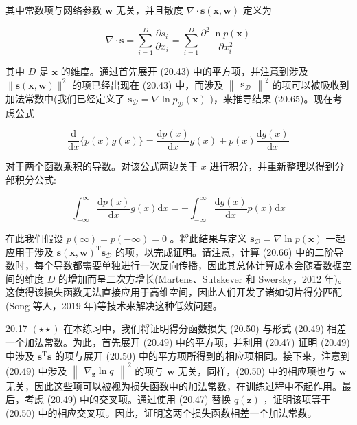 \documentclass[10pt]{report}
\begin{document}
其中常数项与网络参数 \(\mathbf{w}\) 无关，并且散度 \(\nabla  \cdot  \mathbf{s}\left( {\mathbf{x},\mathbf{w}}\right)\) 定义为

\[
\nabla  \cdot  \mathbf{s} = \mathop{\sum }\limits_{{i = 1}}^{D}\frac{\partial {s}_{i}}{\partial {x}_{i}} = \mathop{\sum }\limits_{{i = 1}}^{D}\frac{{\partial }^{2}\ln p\left( \mathbf{x}\right) }{\partial {x}_{i}^{2}} \tag{20.66}
\]

其中 \(D\) 是 \(\mathbf{x}\) 的维度。通过首先展开 (20.43) 中的平方项，并注意到涉及 \(\parallel \mathbf{s}\left( {\mathbf{x},\mathbf{w}}\right) {\parallel }^{2}\) 的项已经出现在 (20.43) 中，而涉及 \({\begin{Vmatrix}{\mathbf{s}}_{\mathcal{D}}\end{Vmatrix}}^{2}\) 的项可以被吸收到加法常数中(我们已经定义了 \({\mathbf{s}}_{\mathcal{D}} = \nabla \ln {p}_{\mathcal{D}}\left( \mathbf{x}\right)\) )，来推导结果 (20.65)。现在考虑公式

\[
\frac{\mathrm{d}}{\mathrm{d}x}\{ p\left( x\right) g\left( x\right) \}  = \frac{\mathrm{d}p\left( x\right) }{\mathrm{d}x}g\left( x\right)  + p\left( x\right) \frac{\mathrm{d}g\left( x\right) }{\mathrm{d}x} \tag{20.67}
\]

对于两个函数乘积的导数。对该公式两边关于 \(x\) 进行积分，并重新整理以得到分部积分公式:

\[
{\int }_{-\infty }^{\infty }\frac{\mathrm{d}p\left( x\right) }{\mathrm{d}x}g\left( x\right) \mathrm{d}x =  - {\int }_{-\infty }^{\infty }\frac{\mathrm{d}g\left( x\right) }{\mathrm{d}x}p\left( x\right) \mathrm{d}x \tag{20.68}
\]

在此我们假设 \(p\left( \infty \right)  = p\left( {-\infty }\right)  = 0\) 。将此结果与定义 \({\mathbf{s}}_{\mathcal{D}} = \nabla \ln p\left( \mathbf{x}\right)\) 一起应用于涉及 \(\mathbf{s}{\left( \mathbf{x},\mathbf{w}\right) }^{\mathrm{T}}{\mathbf{s}}_{\mathcal{D}}\) 的项，以完成证明。请注意，计算 (20.66) 中的二阶导数时，每个导数都需要单独进行一次反向传播，因此其总体计算成本会随着数据空间的维度 \(D\) 的增加而呈二次方增长(Martens、Sutskever 和 Swersky，2012 年)。这使得该损失函数无法直接应用于高维空间，因此人们开发了诸如切片得分匹配(Song 等人，2019 年)等技术来解决这种低效问题。

20.17 \(\left( {\star  \star  }\right)\) 在本练习中，我们将证明得分函数损失 (20.50) 与形式 (20.49) 相差一个加法常数。为此，首先展开 (20.49) 中的平方项，并利用 (20.47) 证明 (20.49) 中涉及 \({\mathbf{s}}^{\mathrm{T}}\mathbf{s}\) 的项与展开 (20.50) 中的平方项所得到的相应项相同。接下来，注意到 (20.49) 中涉及 \({\begin{Vmatrix}{\nabla }_{\mathbf{z}}\ln q\end{Vmatrix}}^{2}\) 的项与 \(\mathbf{w}\) 无关，同样，(20.50) 中的相应项也与 \(\mathbf{w}\) 无关，因此这些项可以被视为损失函数中的加法常数，在训练过程中不起作用。最后，考虑 (20.49) 中的交叉项。通过使用 (20.47) 替换 \(q\left( \mathbf{z}\right)\) ，证明该项等于 (20.50) 中的相应交叉项。因此，证明这两个损失函数相差一个加法常数。
\end{document}
